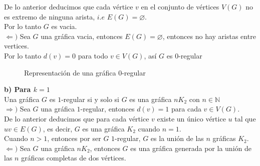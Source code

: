 \documentclass[12pt]{article}
\begin{document}
De lo anterior deducimos que cada vértice $v$ en el conjunto de vértices $V(G)$ no es extremo 
de ninguna arista, $i.e$ $E(G) = \varnothing$.\\

Por lo tanto $G$ es vacia.\\

$\Longleftarrow)$ Sea $G$ una gráfica vacia, entonces $E(G) = \varnothing$, entonces no hay aristas entre vertices.\\

Por lo tanto $d(v) = 0$ para todo $v \in V(G)$, así $G$ es $0$-regular\\

\begin{figure}[h!]
    \centering
    \begin{minipage}{0.6\textwidth}
        \centering
        \caption{Representación de una gráfica $0$-regular}
    \end{minipage}
\end{figure}

\textbf{b) Para $k = 1$}\\

Una gráfica $G$ es $1$-regular si y solo si $G$ es una gráfica $nK_2$ con $n \in \mathbb{N}$\\

$\Longrightarrow)$ Sea $G$ una gráfica $1$-regular, entonces $d(v) = 1$ para cada $v \in V(G)$.\\

De lo anterior deducimos que para cada vértice $v$ existe un único vértice $u$ tal que $uv \in E(G)$, 
es decir, $G$  es una gráfica $K_2$ cuando $n = 1$.\\

Cuando $n > 1$, entonces por ser $G$ $1$-regular, $G$ es la unión de las $n$ gráficas $K_2$.\\

$\Longleftarrow)$ Sea $G$ una gráfica $nK_2$, entonces $G$ es una gráfica generada por la unión 
de las $n$ gráficas completas de dos vértices.\\
\end{document}
